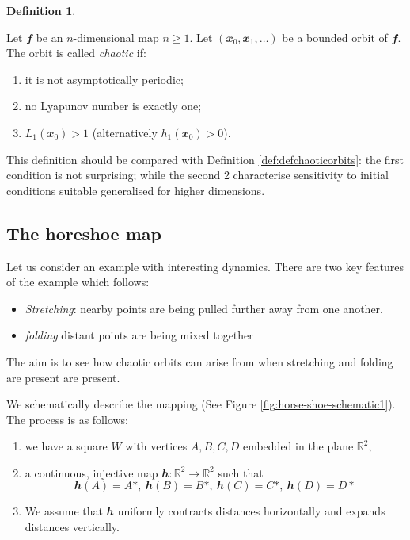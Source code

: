 \documentclass[
  a4paper,
  oneside,
  final]{krantz}
\providecommand{\tightlist}{%
  \setlength{\itemsep}{0pt}\setlength{\parskip}{0pt}}
\newcommand{\R}{\mathbb{R}}
\renewcommand{\v}[1]{{\mathbfit{#1}}}
\theoremstyle{definition}
\newtheorem{definition}{Definition}[chapter]
\theoremstyle{definition}
\theoremstyle{definition}
\theoremstyle{definition}
\theoremstyle{remark}
\begin{document}
\begin{definition}
\protect\hypertarget{def:chaoticorbitndim}{}\label{def:chaoticorbitndim}

Let \(\v{f}\) be an \(n\)-dimensional map \(n \ge 1\). Let \((\v{x}_0, \v{x}_1, \ldots)\) be a bounded orbit of \(\v{f}\). The orbit is called \emph{chaotic} if:

\begin{enumerate}
\def\labelenumi{\arabic{enumi}.}
\tightlist
\item
  it is not asymptotically periodic;
\item
  no Lyapunov number is exactly one;
\item
  \(L_1(\v{x}_0)>1\) (alternatively \(h_1(\v{x}_{0}) >0\)).
\end{enumerate}

\end{definition}

This definition should be compared with Definition \ref{def:defchaoticorbits}: the first condition is not surprising; while the second 2 characterise sensitivity to initial conditions suitable generalised for higher dimensions.

\hypertarget{horeshoemap}{%
\subsection{The horeshoe map}\label{horeshoemap}}

Let us consider an example with interesting dynamics. There are two key features of the example which follows:

\begin{itemize}
\tightlist
\item
  \emph{Stretching}: nearby points are being pulled further away from one another.
\item
  \emph{folding} distant points are being mixed together
\end{itemize}

The aim is to see how chaotic orbits can arise from when stretching and folding are present are present.

We schematically describe the mapping (See Figure \ref{fig:horse-shoe-schematic1}). The process is as follows:

\begin{enumerate}
\def\labelenumi{\arabic{enumi}.}
\tightlist
\item
  we have a square \(W\) with vertices \(A,B,C,D\) embedded in the plane \(\R^2\),
\item
  a continuous, injective map \(\v{h}: \R^2 \to \R^2\) such that
  \[\v{h}(A) = A*, \ \v{h}(B) = B*, \ \v{h}(C) = C*, \ \v{h}(D) = D*\]
\item
  We assume that \(\v{h}\) uniformly contracts distances horizontally and expands distances vertically.
\end{enumerate}
\end{document}
